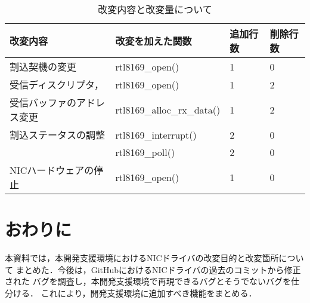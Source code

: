 \documentclass[12pt]{jsarticle}
\begin{document}
\begin{table}[htbp]
    \caption{改変内容と改変量について}
    \label{kaihenryou}
    \begin{center}
        \begin{tabular}{l|l|l|l}   \hline \hline 
            改変内容                   & 改変を加えた関数           & 追加行数 & 削除行数 \\ \hline
            割込契機の変更             & rtl8169\_open()            & 1        & 0        \\ \hline
            受信ディスクリプタ，       & rtl8169\_open()            & 1        & 2        \\
            受信バッファのアドレス変更 & rtl8169\_alloc\_rx\_data() & 1        & 2        \\ \hline 
            割込ステータスの調整       & rtl8169\_interrupt()       & 2        & 0        \\
                                       & rtl8169\_poll()            & 2        & 0        \\ \hline 
            NICハードウェアの停止      & rtl8169\_open()            & 1        & 0        \\ \hline
        \end{tabular}
    \end{center}
\end{table}

\section{おわりに}
本資料では，本開発支援環境におけるNICドライバの改変目的と改変箇所について
まとめた．今後は，GitHubにおけるNICドライバの過去のコミットから修正された
バグを調査し，本開発支援環境で再現できるバグとそうでないバグを仕分ける．
これにより，開発支援環境に追加すべき機能をまとめる．
\end{document}
